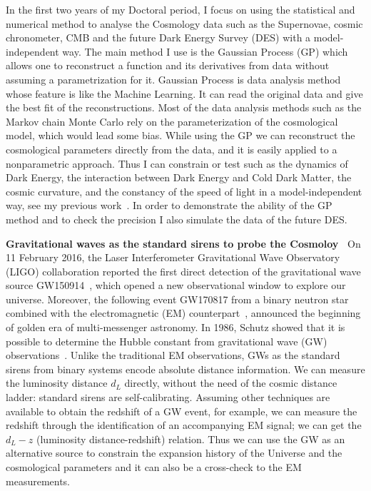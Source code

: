 \documentclass[11pt,letterpaper,sans]{moderncv}   %
\begin{document}
\vspace{2mm}
\noindent
In the first two years of my Doctoral period, I focus on using the statistical and numerical method to analyse the Cosmology data such as the Supernovae, cosmic chronometer, CMB and the future Dark Energy Survey (DES) with a model-independent way. The main method I use is the Gaussian Process (GP) which allows one to reconstruct a function and its derivatives from data without assuming a parametrization for it.
Gaussian Process is data analysis method whose feature is like the Machine Learning. It can read the original data and give the best fit of the reconstructions. Most of the data analysis methods such as the Markov chain Monte Carlo rely on the parameterization of the cosmological model, which would lead some bias.  While using the GP we can reconstruct the cosmological parameters directly from the data, and it is easily applied to a  nonparametric approach.
Thus I can constrain or test such as the dynamics of Dark Energy, the interaction between Dark Energy and Cold Dark Matter, the cosmic curvature, and the constancy of the speed of light in a model-independent way, see my previous work~\cite{Cai:2015zoa,Cai:2015pia,Cai:2016vmn}. In order to demonstrate the ability of the GP method and to check the precision I also simulate the data of the future DES.

\vspace{2mm}
\noindent
\textcolor{color1}{\textbf{Gravitational waves as the standard sirens to probe the Cosmoloy~\cite{Cai:2016sby,Cai:2017yww,Yang:2017bkv,Cai:2017aea}}} On 11 February 2016, the Laser Interferometer Gravitational Wave Observatory (LIGO) collaboration reported the first direct detection of the gravitational wave source GW150914~\cite{Abbott:2016blz}, which opened a new observational window to explore our universe. Moreover, the following event GW170817 from a binary neutron star combined with the electromagnetic (EM) counterpart~\cite{TheLIGOScientific:2017qsa}, announced the beginning of golden era of multi-messenger astronomy. In 1986, Schutz showed that it is possible to determine the Hubble constant from gravitational wave (GW) observations~\cite{Schutz:1986gp}.
Unlike the traditional EM observations, GWs as the standard sirens from binary systems encode absolute distance information. We can measure the luminosity distance $d_L$ directly, without the need of the cosmic distance ladder: standard sirens are self-calibrating. Assuming other techniques are available to obtain the redshift  of a GW event, for example, we can measure the redshift through the identification of an accompanying EM signal; we can get the $d_L-z$ (luminosity distance-redshift) relation. Thus we can use the GW as an alternative source to constrain the expansion history of the Universe and the cosmological parameters and it can also be a cross-check to the EM measurements.
\end{document}
